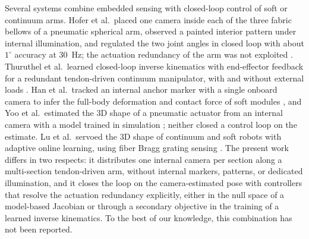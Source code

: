 Several systems combine embedded sensing with closed-loop control of soft or continuum arms. Hofer et al.\ placed one camera inside each of the three fabric bellows of a pneumatic spherical arm, observed a painted interior pattern under internal illumination, and regulated the two joint angles in closed loop with about $1^\circ$ accuracy at 30~Hz; the actuation redundancy of the arm was not exploited \cite{hoferVisionBasedSensingApproach2021}. Thuruthel et al.\ learned closed-loop inverse kinematics with end-effector feedback for a redundant tendon-driven continuum manipulator, with and without external loads \cite{thuruthelLearningClosedLoop2017}. Han et al.\ tracked an internal anchor marker with a single onboard camera to infer the full-body deformation and contact force of soft modules \cite{hanAnchoringMorphologicalRepresentations2025}, and Yoo et al.\ estimated the 3D shape of a pneumatic actuator from an internal camera with a model trained in simulation \cite{yooZeroShotSimtoRealTransfer2023}; neither closed a control loop on the estimate. Lu et al.\ servoed the 3D shape of continuum and soft robots with adaptive online learning, using fiber Bragg grating sensing \cite{luAdaptiveOnlineLearning2024}. The present work differs in two respects: it distributes one internal camera per section along a multi-section tendon-driven arm, without internal markers, patterns, or dedicated illumination, and it closes the loop on the camera-estimated pose with controllers that resolve the actuation redundancy explicitly, either in the null space of a model-based Jacobian or through a secondary objective in the training of a learned inverse kinematics. To the best of our knowledge, this combination has not been reported.

